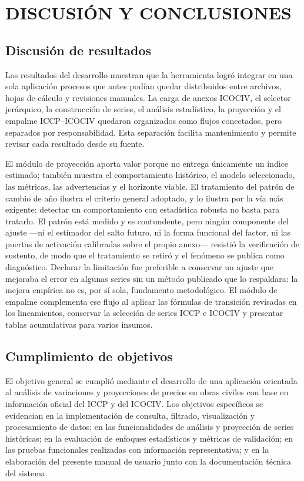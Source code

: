\documentclass[12pt,letterpaper]{article}
\newcommand{\ICOCIV}{ICOCIV}
\newcommand{\ICCP}{ICCP}
\begin{document}
\section{DISCUSIÓN Y CONCLUSIONES}

\subsection{Discusión de resultados}

Los resultados del desarrollo muestran que la herramienta logró integrar en una sola aplicación procesos que antes podían quedar distribuidos entre archivos, hojas de cálculo y revisiones manuales. La carga de anexos \ICOCIV, el selector jerárquico, la construcción de series, el análisis estadístico, la proyección y el empalme \ICCP--\ICOCIV{} quedaron organizados como flujos conectados, pero separados por responsabilidad. Esta separación facilita mantenimiento y permite revisar cada resultado desde su fuente.

El módulo de proyección aporta valor porque no entrega únicamente un índice estimado; también muestra el comportamiento histórico, el modelo seleccionado, las métricas, las advertencias y el horizonte viable. El tratamiento del patrón de cambio de año ilustra el criterio general adoptado, y lo ilustra por la vía más exigente: detectar un comportamiento con estadística robusta no basta para tratarlo. El patrón está medido y es contundente, pero ningún componente del ajuste ---ni el estimador del salto futuro, ni la forma funcional del factor, ni las puertas de activación calibradas sobre el propio anexo--- resistió la verificación de sustento, de modo que el tratamiento se retiró y el fenómeno se publica como diagnóstico. Declarar la limitación fue preferible a conservar un ajuste que mejoraba el error en algunas series sin un método publicado que lo respaldara: la mejora empírica no es, por sí sola, fundamento metodológico. El módulo de empalme complementa ese flujo al aplicar las fórmulas de transición revisadas en los lineamientos, conservar la selección de series \ICCP{} e \ICOCIV{} y presentar tablas acumulativas para varios insumos.

\subsection{Cumplimiento de objetivos}

El objetivo general se cumplió mediante el desarrollo de una aplicación orientada al análisis de variaciones y proyecciones de precios en obras civiles con base en información oficial del \ICCP{} y del \ICOCIV. Los objetivos específicos se evidencian en la implementación de consulta, filtrado, visualización y procesamiento de datos; en las funcionalidades de análisis y proyección de series históricas; en la evaluación de enfoques estadísticos y métricas de validación; en las pruebas funcionales realizadas con información representativa; y en la elaboración del presente manual de usuario junto con la documentación técnica del sistema.
\end{document}
